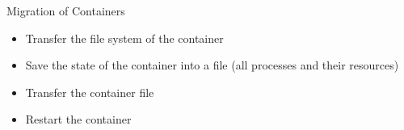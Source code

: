	\begin{frame}[fragile]{Migration of Containers}

		\begin{itemize}
			\setlength \itemsep{0.7em}
			\item Transfer the file system of the container
			\item Save the state of the container into a file (all processes and their resources)
			\item Transfer the container file
			\item Restart the container
		\end{itemize}
	\end{frame}

